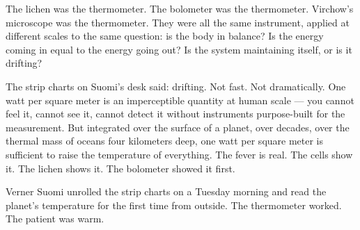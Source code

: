 \documentclass[12pt, letterpaper]{article}
\begin{document}
The lichen was the thermometer. The bolometer was the thermometer. Virchow's microscope was the thermometer. They were all the same instrument, applied at different scales to the same question: is the body in balance? Is the energy coming in equal to the energy going out? Is the system maintaining itself, or is it drifting?

The strip charts on Suomi's desk said: drifting. Not fast. Not dramatically. One watt per square meter is an imperceptible quantity at human scale --- you cannot feel it, cannot see it, cannot detect it without instruments purpose-built for the measurement. But integrated over the surface of a planet, over decades, over the thermal mass of oceans four kilometers deep, one watt per square meter is sufficient to raise the temperature of everything. The fever is real. The cells show it. The lichen shows it. The bolometer showed it first.

Verner Suomi unrolled the strip charts on a Tuesday morning and read the planet's temperature for the first time from outside. The thermometer worked. The patient was warm.
\end{document}
